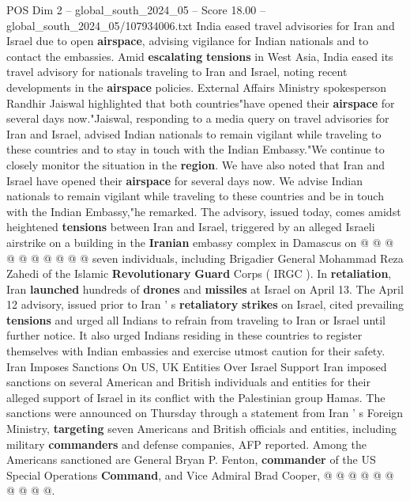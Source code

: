 \begin{textsample}{POS Dim 2 – global\_south\_2024\_05 – Score 18.00 – global\_south\_2024\_05/107934006.txt}  \label{ex:f2_pos_223}
India eased travel advisories for Iran and Israel due to open \textbf{airspace}, advising vigilance for Indian nationals and to contact the embassies.
Amid \textbf{escalating} \textbf{tensions} in West Asia, India eased its travel advisory for nationals traveling to Iran and Israel, noting recent developments in the \textbf{airspace} policies.
External Affairs Ministry spokesperson Randhir Jaiswal highlighted that both countries"have opened their \textbf{airspace} for several days now."Jaiswal, responding to a media query on travel advisories for Iran and Israel, advised Indian nationals to remain vigilant while traveling to these countries and to stay in touch with the Indian Embassy."We continue to closely monitor the situation in the \textbf{region}.
We have also noted that Iran and Israel have opened their \textbf{airspace} for several days now.
We advise Indian nationals to remain vigilant while traveling to these countries and be in touch with the Indian Embassy,"he remarked.
The advisory, issued today, comes amidst heightened \textbf{tensions} between Iran and Israel, triggered by an alleged Israeli airstrike on a building in the \textbf{Iranian} embassy complex in Damascus on @ @ @ @ @ @ @ @ @ @ seven individuals, including Brigadier General Mohammad Reza Zahedi of the Islamic \textbf{Revolutionary} \textbf{Guard} Corps ( IRGC ).
In \textbf{retaliation}, Iran \textbf{launched} hundreds of \textbf{drones} and \textbf{missiles} at Israel on April 13.
The April 12 advisory, issued prior to Iran ' s \textbf{retaliatory} \textbf{strikes} on Israel, cited prevailing \textbf{tensions} and urged all Indians to refrain from traveling to Iran or Israel until further notice.
It also urged Indians residing in these countries to register themselves with Indian embassies and exercise utmost caution for their safety.
Iran Imposes Sanctions On US, UK Entities Over Israel Support Iran imposed sanctions on several American and British individuals and entities for their alleged support of Israel in its conflict with the Palestinian group Hamas.
The sanctions were announced on Thursday through a statement from Iran ' s Foreign Ministry, \textbf{targeting} seven Americans and British officials and entities, including military \textbf{commanders} and defense companies, AFP reported.
Among the Americans sanctioned are General Bryan P.
Fenton, \textbf{commander} of the US Special Operations \textbf{Command}, and Vice Admiral Brad Cooper, @ @ @ @ @ @ @ @ @ @.

\end{textsample}
